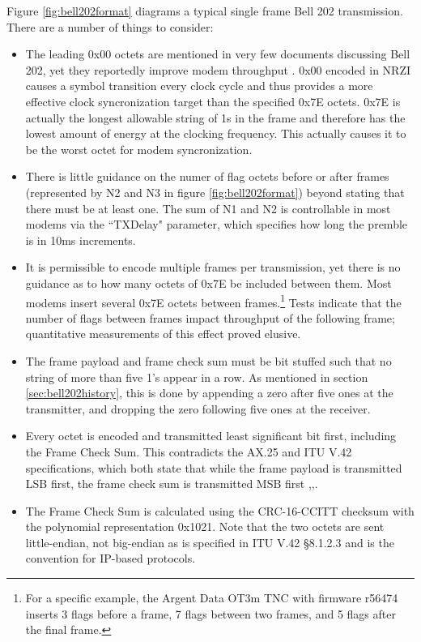 \documentclass[12pt,letterpaper]{article}
\begin{document}
Figure \ref{fig:bell202format} diagrams a typical single frame
Bell 202 transmission. There are a number of things to
consider:
\begin{itemize}
	\item The leading 0x00 octets are mentioned in very few documents
		discussing Bell 202, yet they reportedly improve modem
		throughput \cite{millerinterview}. 
		0x00 encoded in NRZI causes a symbol transition
		every clock cycle and thus provides a more effective clock 
		syncronization target than the specified 0x7E octets. 0x7E is actually 
		the longest allowable string of 1s in the frame and 
		therefore has the lowest amount of energy at the clocking frequency.
		This actually causes it to be the worst 
		octet for modem syncronization.
	\item There is little guidance on the numer of flag octets before
		or after frames (represented by N2 and N3 in 
		figure \ref{fig:bell202format})
		beyond stating that there must be at least one. The sum of
		N1 and N2 is controllable in most modems via the ``TXDelay" parameter,
		which specifies how long the premble is in 10ms increments.
	\item It is permissible to encode multiple 
		frames per transmission, yet there is no guidance as to how
		many octets of 0x7E be included between them.
		Most modems insert several 0x7E octets between 
		frames.\footnote{For a specific example, the Argent Data OT3m TNC 
			with firmware r56474 inserts 3 flags before
		a frame, 7 flags between two frames, and 5 flags after the final frame.}
		Tests indicate that the number of flags between frames 
		impact throughput of the following frame;
		quantitative measurements of this effect proved elusive.
	\item The frame payload and frame check sum must be bit stuffed such 
		that no string of more than five 1's appear in a row.
		As mentioned in section \ref{sec:bell202history}, this is 
		done by appending a zero after five ones at the transmitter,
		and dropping the zero following five ones at the receiver.
	\item Every octet is encoded and transmitted least significant bit first,
		including the Frame Check Sum.
		This contradicts the AX.25 and ITU V.42 specifications, 
		which both state
		that while the frame payload is transmitted LSB first, the frame
		check sum is transmitted MSB first 
		\cite[\S3.8]{ax25spec},\cite{n1vgphy},\cite[\S8.1.2.2-3]{ituv42}.
	\item The Frame Check Sum is calculated using the CRC-16-CCITT checksum
		with the polynomial representation 0x1021. 
		Note that the two octets are sent little-endian, not
		big-endian as is specified in ITU V.42 \S8.1.2.3 and is the
		convention for IP-based protocols.

\end{itemize}
\end{document}
